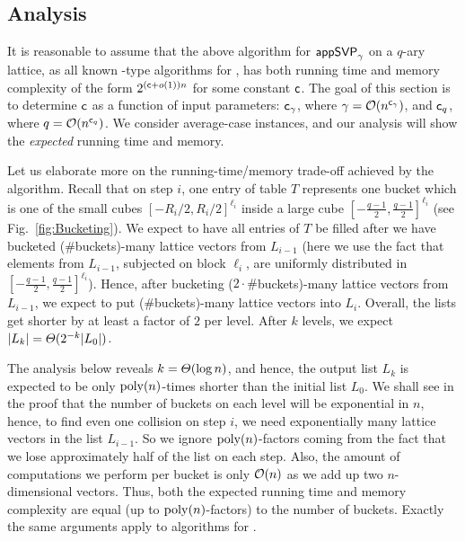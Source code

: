 \subsection{Analysis} \label{subsec:qAryAnalysis}

It is reasonable to assume that the above algorithm for $\textsf{appSVP}_{\gamma}$ on a $q$-ary lattice, as all known \BKW-type algorithms for \LWE, has both running time and memory complexity of the form $2^{(\mathsf{c}+o(1) )n}$ for some constant $\mathsf{c}$. The goal of this section is to determine $\mathsf{c}$ as a function of input parameters: $\mathsf{c}_{\gamma}$, where $\gamma = \mathcal{O}(n^{\mathsf{c}_{\gamma}})$, and $\mathsf{c}_q$, where $q = \mathcal{O}(n^{\mathsf{c}_q})$. We consider average-case instances, and our analysis will show the \emph{expected} running time and memory.

Let us elaborate more on the running-time/memory trade-off achieved by the algorithm. Recall that on step $i$, one entry of table $T$ represents one bucket which is one of the small cubes $[-R_i/2, R_i/2]^{\ell_i}$ inside a large cube $[-\frac{q-1}{2}, \frac{q-1}{2}]^{\ell_i}$ (see Fig.~\ref{fig:Bucketing}). We expect to have all entries of $T$ be filled after we have bucketed ($\#$buckets)-many lattice vectors from $L_{i-1}$ (here we use the fact that elements from $L_{i-1}$, subjected on block $\ell_i$, are uniformly distributed in $[-\frac{q-1}{2}, \frac{q-1}{2}]^{\ell_i}$). Hence, after bucketing ($2 \cdot \#$buckets)-many lattice vectors from $L_{i-1}$, we expect to put ($\#$buckets)-many lattice vectors into $L_i$. Overall, the lists get shorter by at least a factor of $2$ per level. After $k$ levels, we expect $|L_k| = \varTheta(2^{-k} |L_0|)$. 

The analysis below reveals $k = \varTheta(\log n)$, and hence, the output list $L_k$ is expected to be only $\mathrm{poly}(n)$-times shorter than the initial list $L_0$. We shall see in the proof that the number of buckets on each level will be exponential in $n$, hence, to find even one collision on step $i$, we need exponentially many lattice vectors in the list $L_{i-1}$. So we ignore $\mathrm{poly}(n)$-factors coming from the fact that we lose approximately half of the list on each step. Also, the amount of computations we perform per bucket is only $\mathcal{O}(n)$ as we add up two $n$-dimensional vectors. Thus, both the expected running time and memory complexity are equal (up to $\mathrm{poly}(n)$-factors) to the number of buckets. Exactly the same arguments apply to \BKW algorithms for \LWE.

